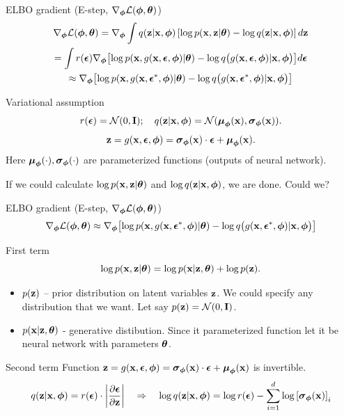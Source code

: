 \begin{frame}{ELBO gradient (E-step, $\nabla_{\bphi} \mathcal{L}(\bphi, \btheta)$)}
	\vspace{-0.7cm}
	\begin{multline*}
		\nabla_{\bphi} \mathcal{L} (\bphi, \btheta) = \nabla_{\bphi}\int q(\bz|\bx, \bphi) \left[\log p(\bx, \bz | \btheta)  - \log q(\bz | \bx, \bphi)\right] d\bz
		\\ = \int r(\bepsilon) \nabla_{\bphi} \bigl[\log p(\bx, g(\bx, \bepsilon, \bphi) | \btheta)  - \log q\bigl(g(\bx, \bepsilon, \bphi) | \bx, \bphi \bigr)\bigr]d\bepsilon
		\\ \approx \nabla_{\bphi} \bigl[\log p(\bx, g(\bx, \bepsilon^*, \bphi) | \btheta)  - \log q\bigl(g(\bx, \bepsilon^*, \bphi) | \bx, \bphi \bigr)\bigr]
	\end{multline*}
	\vspace{-0.7cm}
	\begin{block}{Variational assumption}
		\[
			r(\bepsilon) = \mathcal{N}(0, \bI); \quad  q(\bz| \bx, \bphi) = \mathcal{N} (\bmu_{\bphi}(\bx), \bsigma_{\bphi}(\bx)).
		\]
		\[
			\bz = g(\bx, \bepsilon, \bphi) = \bsigma_{\bphi}(\bx) \cdot \bepsilon + \bmu_{\bphi}(\bx).
		\]
		Here $\bmu_{\bphi}(\cdot), \bsigma_{\bphi}(\cdot)$ are parameterized functions (outputs of neural network).
	\end{block}
	If we could calculate $\log p(\bx, \bz | \btheta)$ and $\log q(\bz | \bx, \bphi)$, we are done. Could we?
\end{frame}
\begin{frame}{ELBO gradient (E-step, $\nabla_{\bphi} \mathcal{L}(\bphi, \btheta)$)}
	\vspace{-0.3cm}
	\[
		\nabla_{\bphi} \mathcal{L} (\bphi, \btheta) \approx \nabla_{\bphi} \bigl[\log p(\bx, g(\bx, \bepsilon^*, \bphi) | \btheta)  - \log q\bigl(g(\bx, \bepsilon^*, \bphi) | \bx, \bphi \bigr)\bigr]
	\]
	\vspace{-0.3cm}
	\begin{block}{First term}
		\vspace{-0.3cm}
		\[
			\log p(\bx, \bz | \btheta) = \log p(\bx | \bz, \btheta) + \log p(\bz).
		\]
		\vspace{-0.3cm}
		\begin{itemize}
			\item $p(\bz)$ -- prior distribution on latent variables $\bz$. We could specify any distribution that we want. Let say $p(\bz) = \cN (0, \bI)$.
			\item $p(\bx | \bz, \btheta)$ - generative distibution. Since it parameterized function let it be neural network with parameters $\btheta$.
		\end{itemize}
	\end{block}
	\begin{block}{Second term}
		Function $\bz = g(\bx, \bepsilon, \bphi)= \bsigma_{\bphi}(\bx) \cdot \bepsilon + \bmu_{\bphi}(\bx)$ is invertible.
		\[
			q(\bz | \bx, \bphi) = r(\bepsilon) \cdot \left| \frac{\partial \bepsilon}{\partial \bz}\right| \quad \Rightarrow \quad 
			\log q(\bz | \bx, \bphi) = \log r(\bepsilon) - \sum_{i=1}^d \log \left[\bsigma_{\bphi}(\bx) \right]_i
		\]
	\end{block}
	
\end{frame}
